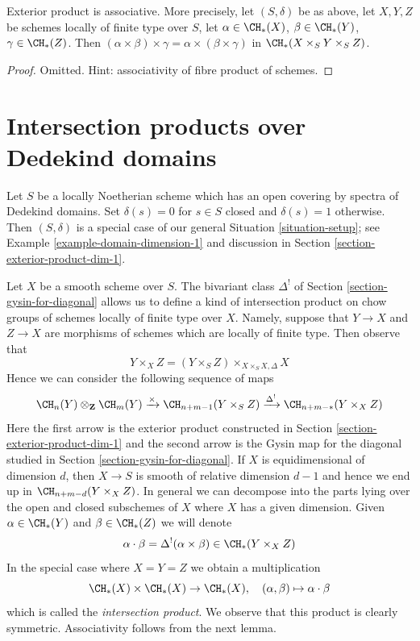\begin{lemma}
\label{lemma-exterior-product-associative-dim-1}
Exterior product is associative. More precisely, let $(S, \delta)$ be
as above, let $X, Y, Z$ be schemes locally of finite type over $S$, let
$\alpha \in \CH_*(X)$, $\beta \in \CH_*(Y)$, $\gamma \in \CH_*(Z)$.
Then $(\alpha \times \beta) \times \gamma =
\alpha \times (\beta \times \gamma)$ in $\CH_*(X \times_S Y \times_S Z)$.
\end{lemma}

\begin{proof}
Omitted. Hint: associativity of fibre product of schemes.
\end{proof}















\section{Intersection products over Dedekind domains}
\label{section-intersection-product-dim-1}

\noindent
Let $S$ be a locally Noetherian scheme which has an open covering
by spectra of Dedekind domains. Set $\delta(s) = 0$ for $s \in S$ closed
and $\delta(s) = 1$ otherwise. Then $(S, \delta)$ is a special case of our
general Situation \ref{situation-setup}; see
Example \ref{example-domain-dimension-1} and discussion in
Section \ref{section-exterior-product-dim-1}.

\medskip\noindent
Let $X$ be a smooth scheme over $S$. The bivariant class $\Delta^!$
of Section \ref{section-gysin-for-diagonal} allows us to define a kind of
intersection product on chow groups of schemes locally of finite type over $X$.
Namely, suppose that $Y \to X$ and $Z \to X$ are morphisms of schemes
which are locally of finite type. Then observe that
$$
Y \times_X Z =  (Y \times_S Z) \times_{X \times_S X, \Delta} X
$$
Hence we can consider the following sequence of maps
$$
\CH_n(Y) \otimes_\mathbf{Z} \CH_m(Y)
\xrightarrow{\times}
\CH_{n + m - 1}(Y \times_S Z)
\xrightarrow{\Delta^!}
\CH_{n + m - *}(Y \times_X Z)
$$
Here the first arrow is the exterior product constructed in
Section \ref{section-exterior-product-dim-1} and the second arrow
is the Gysin map for the diagonal studied in
Section \ref{section-gysin-for-diagonal}. If $X$ is equidimensional
of dimension $d$, then $X \to S$ is smooth of relative dimension $d - 1$
and hence we end up in $\CH_{n + m - d}(Y \times_X Z)$.
In general we can decompose into the parts lying over the open
and closed subschemes of $X$ where $X$ has a given dimension.
Given $\alpha \in \CH_*(Y)$ and $\beta \in \CH_*(Z)$ we will denote
$$
\alpha \cdot \beta = \Delta^!(\alpha \times \beta)
\in \CH_*(Y \times_X Z)
$$
In the special case where $X = Y = Z$ we obtain a multiplication
$$
\CH_*(X) \times \CH_*(X) \to \CH_*(X),\quad
(\alpha, \beta) \mapsto \alpha \cdot \beta
$$
which is called the {\it intersection product}. We observe that
this product is clearly symmetric. Associativity follows from
the next lemma.

